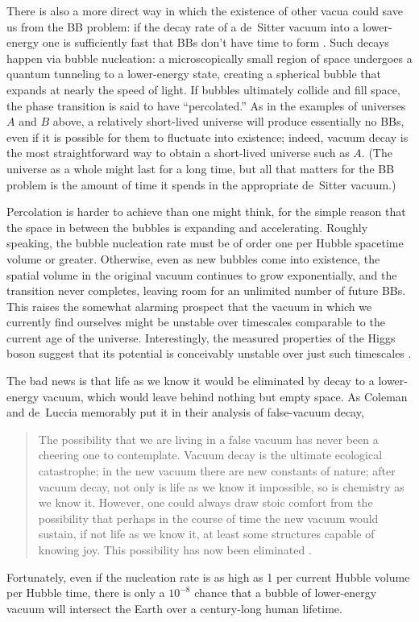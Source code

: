 \documentclass[12pt,letterpaper]{article}
\begin{document}
There is also a more direct way in which the existence of other vacua could save us from the BB problem: if the decay rate of a de~Sitter vacuum into a lower-energy one is sufficiently fast that BBs don't have time to form \cite{Page:2006dt,Page:2009mc}.
Such decays happen via bubble nucleation: a microscopically small region of space undergoes a quantum tunneling to a lower-energy state, creating a spherical bubble that expands at nearly the speed of light.
If bubbles ultimately collide and fill space, the phase transition is said to have ``percolated.''
As in the examples of universes $A$ and $B$ above, a relatively short-lived universe will produce essentially no BBs, even if it is possible for them to fluctuate into existence; indeed, vacuum decay is the most straightforward way to obtain a short-lived universe such as $A$.
(The universe as a whole might last for a long time, but all that matters for the BB problem is the amount of time it spends in the appropriate de~Sitter vacuum.)

Percolation is harder to achieve than one might think, for the simple reason that the space in between the bubbles is expanding and accelerating.
Roughly speaking, the bubble nucleation rate must be of order one per Hubble spacetime volume or greater.
Otherwise, even as new bubbles come into existence, the spatial volume in the original vacuum continues to grow exponentially, and the transition never completes, leaving room for an unlimited number of future BBs.
This raises the somewhat alarming prospect that the vacuum in which we currently find ourselves might be unstable over timescales comparable to the current age of the universe.
Interestingly, the measured properties of the Higgs boson suggest that its potential is conceivably unstable over just such timescales \cite{Espinosa:2007qp,ArkaniHamed:2008ym,Alekhin:2012py,Buttazzo:2013uya,Boddy:2013qma}.

The bad news is that life as we know it would be eliminated by decay to a lower-energy vacuum, which would leave behind nothing but empty space.
As Coleman and de~Luccia memorably put it in their analysis of false-vacuum decay,
\begin{quotation}
The possibility that we are living in a false vacuum has never been a cheering one to contemplate. Vacuum decay is the ultimate ecological catastrophe; in the new vacuum there are new constants of nature; after vacuum decay, not only is life as we know it impossible, so is chemistry as we know it. However, one could always draw stoic comfort from the possibility that perhaps in the course of time the new vacuum would sustain, if not life as we know it, at least some structures capable of knowing joy. This possibility has now been eliminated \cite{Coleman:1980aw}.
\end{quotation}
Fortunately, even if the nucleation rate is as high as 1 per current Hubble volume per Hubble time, there is only a $10^{-8}$ chance that a bubble of lower-energy vacuum will intersect the Earth over a century-long human lifetime.
\end{document}
